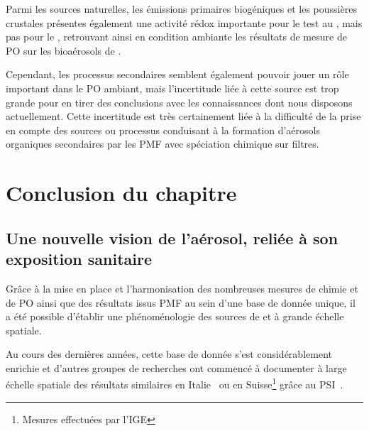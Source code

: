 Parmi les sources naturelles, les émissions primaires biogéniques et les poussières
crustales présentes également une activité rédox importante pour le test au \PODTT, mais
pas pour le \POAA, retrouvant ainsi en condition ambiante les résultats de mesure de PO
sur les bioaérosols de \cite{samakeUnexpected2017}.

Cependant, les processus secondaires semblent également pouvoir jouer un rôle important
dans le PO ambiant, mais l'incertitude liée à cette source est trop grande pour en tirer
des conclusions avec les connaissances dont nous disposons actuellement. Cette
incertitude est très certainement liée à la difficulté de la prise en compte des sources
ou processus conduisant à la formation d'aérosols organiques secondaires par les PMF avec
spéciation chimique sur filtres.



\section{Conclusion du chapitre}%
\label{sec:conclusion_chap4}

\subsection{Une nouvelle vision de l'aérosol, reliée à son exposition sanitaire}%
\label{sub:une_nouvelle_vision_de_l_aérosol_plus_proche_de_l_impact_sanitaire}

Grâce à la mise en place et l'harmonisation des nombreuses mesures de chimie et de PO
ainsi que des résultats issus PMF au sein d'une base de donnée unique, il a été possible
d'établir une phénoménologie des sources de \POAA{} et \PODTT{} à grande échelle spatiale.

Au cours des dernières années, cette base de donnée s'est considérablement enrichie et
d'autres groupes de recherches ont commencé à documenter à large échelle spatiale des
résultats similaires en Italie~\autocite{pietrograndeReview2019} ou en
Suisse\footnote{Mesures effectuées par l'IGE} grâce au
PSI~\autocite{daellenbachSourcessubmitted}. 

